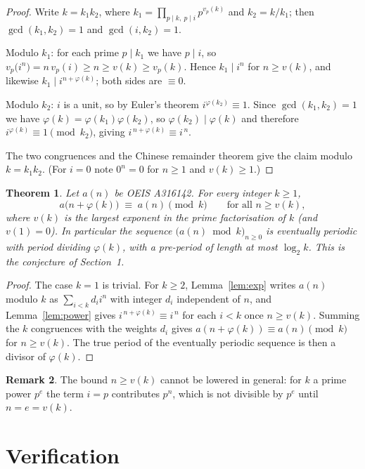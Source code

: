 \documentclass[11pt,a4paper]{article}
\theoremstyle{plain}
\newtheorem{theorem}{Theorem}
\theoremstyle{definition}
\newtheorem{remark}[theorem]{Remark}
\begin{document}
\begin{proof}
Write $k=k_1k_2$, where $k_1=\prod_{p\mid k,\ p\mid i}p^{v_p(k)}$ and $k_2=k/k_1$; then
$\gcd(k_1,k_2)=1$ and $\gcd(i,k_2)=1$.

Modulo $k_1$: for each prime $p\mid k_1$ we have $p\mid i$, so
$v_p\bigl(i^{n}\bigr)=n\,v_p(i)\ge n\ge v(k)\ge v_p(k)$. Hence $k_1\mid i^{n}$ for
$n\ge v(k)$, and likewise $k_1\mid i^{n+\varphi(k)}$; both sides are $\equiv 0$.

Modulo $k_2$: $i$ is a unit, so by Euler's theorem $i^{\varphi(k_2)}\equiv 1$. Since
$\gcd(k_1,k_2)=1$ we have $\varphi(k)=\varphi(k_1)\varphi(k_2)$, so
$\varphi(k_2)\mid\varphi(k)$ and therefore $i^{\varphi(k)}\equiv 1 \pmod{k_2}$, giving
$i^{\,n+\varphi(k)}\equiv i^{\,n}$.

The two congruences and the Chinese remainder theorem give the claim modulo $k=k_1k_2$.
(For $i=0$ note $0^{n}=0$ for $n\ge 1$ and $v(k)\ge1$.)
\end{proof}

\begin{theorem}\label{thm:main}
Let $a(n)$ be OEIS A316142. For every integer $k\ge1$,
\[
a\bigl(n+\varphi(k)\bigr)\;\equiv\;a(n)\pmod{k}\qquad\text{for all } n\ge v(k),
\]
where $v(k)$ is the largest exponent in the prime factorisation of $k$ (and $v(1)=0$).
In particular the sequence $\bigl(a(n)\bmod k\bigr)_{n\ge0}$ is eventually periodic with
period dividing $\varphi(k)$, with a pre-period of length at most $\log_2 k$. This is the
conjecture of Section~1.
\end{theorem}

\begin{proof}
The case $k=1$ is trivial. For $k\ge2$, Lemma~\ref{lem:exp} writes $a(n)$ modulo $k$ as
$\sum_{i<k}d_i i^{n}$ with integer $d_i$ independent of $n$, and Lemma~\ref{lem:power}
gives $i^{\,n+\varphi(k)}\equiv i^{\,n}$ for each $i<k$ once $n\ge v(k)$. Summing the
$k$ congruences with the weights $d_i$ gives
$a(n+\varphi(k))\equiv a(n)\pmod k$ for $n\ge v(k)$. The true period of the eventually
periodic sequence is then a divisor of $\varphi(k)$.
\end{proof}

\begin{remark}
The bound $n\ge v(k)$ cannot be lowered in general: for $k$ a prime power $p^{e}$ the
term $i=p$ contributes $p^{n}$, which is not divisible by $p^{e}$ until $n=e=v(k)$.
\end{remark}

\section{Verification}
\end{document}
